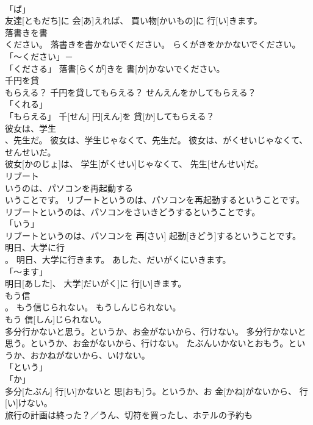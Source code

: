 \documentclass[8pt]{extreport}
\begin{document}
\begin{CJK}{UTF8}{min}
\\	「ば」 
\\	友達[ともだち]に 会[あ]えれば、 買い物[かいもの]に 行[い]きます。		
\\	落書きを書
\\	ください。	落書きを書かないでください。	らくがきをかかないでください。	
\\	「～ください」－ 
\\	「くださる」	落書[らくが]きを 書[か]かないでください。		
\\	千円を貸
\\	もらえる？	千円を貸してもらえる？	せんえんをかしてもらえる？	
\\	「くれる」 
\\	「もらえる」	千[せん] 円[えん]を 貸[か]してもらえる？		
\\	彼女は、学生
\\	、先生だ。	彼女は、学生じゃなくて、先生だ。	彼女は、がくせいじゃなくて、せんせいだ。	
\\	彼女[かのじょ]は、 学生[がくせい]じゃなくて、 先生[せんせい]だ。		
\\	リブート
\\	いうのは、パソコンを再起動する
\\	いうことです。	リブートというのは、パソコンを再起動するということです。	リブートというのは、パソコンをさいきどうするということです。	
\\	「いう」 
\\	リブートというのは、パソコンを 再[さい] 起動[きどう]するということです。		
\\	明日、大学に行
\\	。	明日、大学に行きます。	あした、だいがくにいきます。	
\\	「～ます」 
\\	明日[あした]、 大学[だいがく]に 行[い]きます。		
\\	もう信
\\	。	もう信じられない。	もうしんじられない。	
\\	もう 信[しん]じられない。		
\\	多分行かないと思う。というか、お金がないから、行けない。	多分行かないと思う。というか、お金がないから、行けない。	たぶんいかないとおもう。というか、おかねがないから、いけない。	
\\	「という」 
\\	「か」 
\\	多分[たぶん] 行[い]かないと 思[おも]う。というか、お 金[かね]がないから、 行[い]けない。		
\\	旅行の計画は終った？／うん、切符を買ったし、ホテルの予約も

\end{CJK}
\end{document}
